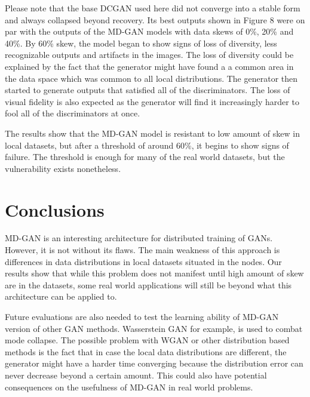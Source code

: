 \documentclass[11pt]{article}       %
\newcommand{\includeFig}[3]      {\begin{figure}[htb] \begin{center}
                                 \includegraphics
                                 [width=4in,keepaspectratio] %
                                 {#2}\caption{\label{#1}#3} \end{center} \end{figure}}
\begin{document}
Please note that the base DCGAN used here did not converge into a stable form and always collapsed beyond recovery. Its best outputs shown in Figure 8 were on par with the outputs of the MD-GAN models with data skews of 0\%, 20\% and 40\%. By 60\% skew, the model began to show signs of loss of diversity, less recognizable outputs and artifacts in the images. The loss of diversity could be explained by the fact that the generator might have found a a common area in the data space which was common to all local distributions. The generator then started to generate outputs that satisfied all of the discriminators. The loss of visual fidelity is also expected as the generator will find it increasingly harder to fool all of the discriminators at once.

The results show that the MD-GAN model is resistant to low amount of skew in local datasets, but after a threshold of around 60\%, it begins to show signs of failure. The threshold is enough for many of the real world datasets, but the vulnerability exists nonetheless. 





\section{Conclusions} \label{concl}

MD-GAN is an interesting architecture for distributed training of GANs. However, it is not without its flaws. The main weakness of this approach is differences in data distributions in local datasets situated in the nodes. Our results show that while this problem does not manifest until high amount of skew are in the datasets, some real world applications will still be beyond what this architecture can be applied to.

Future evaluations are also needed to test the learning ability of MD-GAN version of other GAN methods. Wasserstein GAN for example, is used to combat mode collapse. The possible problem with WGAN or other distribution based methods is the fact that in case the local data distributions are different, the generator might have a harder time converging because the distribution error can never decrease beyond a certain amount. This could also have potential consequences on the usefulness of MD-GAN in real world problems.
\end{document}
